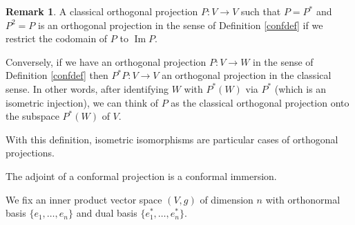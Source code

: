 \documentclass[12pt]{amsart} %
\theoremstyle{definition}
\newtheorem{remark}[theorem]{Remark}
\numberwithin{equation}{section}
\DeclareMathOperator{\Imag}{Im}
\newcommand{\ra}{\rightarrow}
\begin{document}
\begin{remark}
A classical orthogonal projection $P:V\ra V$ such that $P=P^ *$ and $P^ 2=P$ is an orthogonal projection in the sense of Definition \ref{confdef} if we restrict the codomain of $P$ to $\Imag P$.

Conversely, if we have an orthogonal projection $P:V \ra W$ in the sense of Definition \ref{confdef} then $P^ *P:V\ra V$ an orthogonal projection in the classical sense. In other words, after identifying $W$ with $P^ *(W)$ via $P^*$ (which is an isometric injection), we can think of $P$ as the classical orthogonal projection onto the subspace $P^ *(W)$ of $V$.

With this definition, isometric isomorphisms are particular cases of orthogonal projections.

The adjoint of a conformal projection is a conformal immersion. 
\end{remark}

We fix an inner product vector space $(V,g)$ of dimension $n$ with orthonormal basis $\{e_1,\ldots, e_n\}$ and dual basis $\{e_1^ *,\ldots, e_n^ *\}$.
\end{document}
